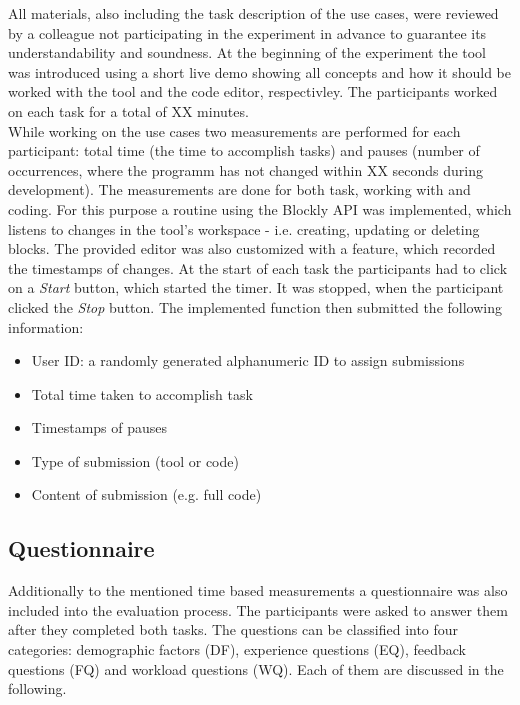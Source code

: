 All materials, also including the task description of the use cases, were reviewed by a colleague not participating in the experiment in advance to guarantee its understandability and soundness. At the beginning of the experiment the tool was introduced using a short live demo showing all concepts and how it should be worked with the tool and the code editor, respectivley. The participants worked on each task for a total of XX minutes. \\

While working on the use cases two measurements are performed for each participant: total time (the time to accomplish tasks) and pauses (number of occurrences, where the programm has not changed within XX seconds during development). The measurements are done for both task, working with \toolname{} and coding. For this purpose a routine using the Blockly API was implemented, which listens to changes in the tool's workspace - i.e. creating, updating or deleting blocks. The provided editor was also customized with a feature, which recorded the timestamps of changes. At the start of each task the participants had to click on a \textit{Start} button, which started the timer. It was stopped, when the participant clicked the \textit{Stop} button. The implemented function then submitted the following information:

\begin{itemize}
    \item User ID: a randomly generated alphanumeric ID to assign submissions
    \item Total time taken to accomplish task
    \item Timestamps of pauses
    \item Type of submission (tool or code)
    \item Content of submission (e.g. full code)
\end{itemize}

\subsection{Questionnaire} \label{sec:Questionnaire}
Additionally to the mentioned time based measurements a questionnaire was also included into the evaluation process. The participants were asked to answer them after they completed both tasks. The questions can be classified into four categories: demographic factors (DF), experience questions (EQ), feedback questions (FQ) and workload questions (WQ). Each of them are discussed in the following.

